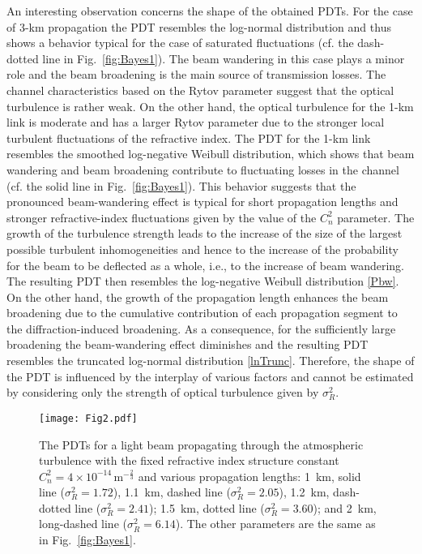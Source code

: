 \documentclass[aps,pra,twocolumn,a4paper,nofootinbib,preprintnumbers] {revtex4-1}
\begin{document}
	 An interesting observation concerns the shape of the obtained PDTs.
	 For the case of 3-km  propagation the PDT resembles the log-normal distribution and thus shows a behavior typical for the case of saturated fluctuations (cf. the dash-dotted line in Fig.~\ref{fig:Bayes1}).
	 The beam wandering in this case plays a minor role and the beam broadening is the main source of transmission losses.
	 The channel characteristics based on the Rytov parameter suggest that the optical turbulence is rather weak.
	 On the other hand, the optical turbulence for the  1-km link is moderate and has a larger Rytov parameter due to the stronger local turbulent fluctuations of the refractive index.
	 The PDT for the 1-km link resembles the smoothed log-negative Weibull distribution, which shows that  beam wandering and  beam broadening contribute  to  fluctuating losses in the channel (cf. the solid line in Fig.~\ref{fig:Bayes1}).
	This behavior suggests that  the pronounced  beam-wandering effect is typical for short propagation lengths and stronger  refractive-index fluctuations given by the value of the  $C_n^2$ parameter.
	The growth of the turbulence strength leads to the increase of the size of the largest possible turbulent inhomogeneities and hence to the increase of the probability for the beam to be deflected as a whole, i.e., to the increase of beam wandering. 
	The resulting PDT then resembles the log-negative Weibull distribution \eqref{Pbw}.
	 On the other hand, the growth of the propagation length enhances the beam broadening due to the cumulative contribution of each propagation segment to the diffraction-induced broadening.
	As a consequence, for the sufficiently large broadening the beam-wandering effect diminishes and the resulting PDT resembles the truncated log-normal distribution \eqref{lnTrunc}.
	 Therefore, the shape of the PDT is influenced by the interplay of various factors and cannot be estimated by considering only the strength of optical turbulence given by $\sigma_R^2$.



\begin{figure}[ht]
 \texttt{[image: Fig2.pdf]}
 \caption{\label{fig:Bayes2}  The PDTs for a light beam propagating through the atmospheric turbulence with  the fixed refractive  index structure constant $C_n^2{=}4{\times} 10^{-14}\,\text{m}^{-\frac{2}{3}}$ and various propagation lengths:  1~km, solid line  ($\sigma_R^2{=}1.72$),  1.1~km, dashed line  ($\sigma_R^2{=}2.05$), 1.2~km, dash-dotted line  ($\sigma_R^2{=}2.41$); 1.5~km, dotted line  ($\sigma_R^2{=}3.60$); and  2~km,  long-dashed line  ($\sigma_R^2{=}6.14$).
 The other parameters are the same as in Fig.~\ref{fig:Bayes1}.
}\end{figure}
\end{document}
